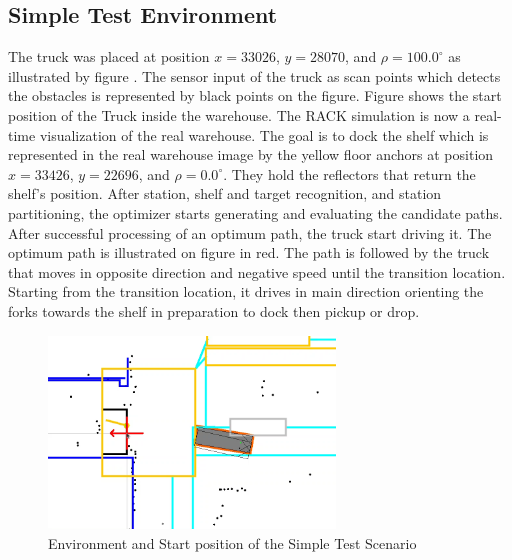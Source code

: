 \subsection{Simple Test Environment}
The truck was placed at position \(x = 33026\), \(y = 28070\), and \(\rho = 100.0^\circ\) 
as illustrated by 
figure .
The sensor input of the truck as scan points which detects the obstacles is represented by black points
on the figure. Figure  shows the start position of the Truck inside the warehouse.
The RACK simulation is now a real-time visualization of the real warehouse.
The goal is to dock the shelf which is represented in the real warehouse image 
by the yellow floor anchors at position \(x = 33426\), \(y = 22696\), and \(\rho = 0.0^\circ\). 
They hold the reflectors that return the shelf's position.
After station, shelf and target recognition, and station partitioning,
the optimizer starts generating and evaluating the candidate paths.
After successful processing of an optimum path, the truck start driving it.
The optimum path is illustrated on figure  in red. The path is followed by the truck 
that moves in opposite direction and negative speed until the transition location.
Starting from the transition location, it drives in main direction orienting the forks 
towards the shelf in preparation to dock then pickup or drop. 


\begin{figure}[H]
    \begin{center}
        \includegraphics[width=3in]{images/Chap3/StartSimpleEnv.png} %
        \caption{Environment and Start position of the Simple Test Scenario}
        \label{OptResult10}
        \end{center}    
\end{figure}



